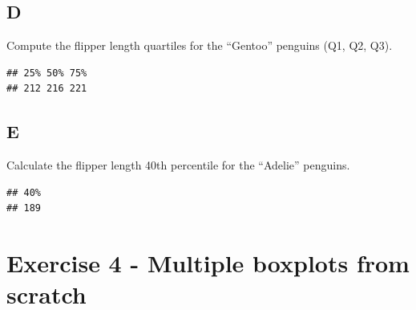 \documentclass[
]{article}
\newenvironment{Shaded}{\begin{snugshade}}{\end{snugshade}}
\newcommand{\AttributeTok}[1]{\textcolor[rgb]{0.13,0.29,0.53}{#1}}
\newcommand{\ConstantTok}[1]{\textcolor[rgb]{0.56,0.35,0.01}{#1}}
\newcommand{\FloatTok}[1]{\textcolor[rgb]{0.00,0.00,0.81}{#1}}
\newcommand{\FunctionTok}[1]{\textcolor[rgb]{0.13,0.29,0.53}{\textbf{#1}}}
\newcommand{\NormalTok}[1]{#1}
\newcommand{\OtherTok}[1]{\textcolor[rgb]{0.56,0.35,0.01}{#1}}
\newcommand{\SpecialCharTok}[1]{\textcolor[rgb]{0.81,0.36,0.00}{\textbf{#1}}}
\newcommand{\StringTok}[1]{\textcolor[rgb]{0.31,0.60,0.02}{#1}}
\begin{document}
\hypertarget{d-2}{%
\subsection{D}\label{d-2}}

Compute the flipper length quartiles for the ``Gentoo'' penguins (Q1,
Q2, Q3).

\begin{Shaded}
\end{Shaded}

\begin{verbatim}
## 25% 50% 75% 
## 212 216 221
\end{verbatim}

\hypertarget{e-1}{%
\subsection{E}\label{e-1}}

Calculate the flipper length 40th percentile for the ``Adelie''
penguins.

\begin{Shaded}
\end{Shaded}

\begin{verbatim}
## 40% 
## 189
\end{verbatim}

\hypertarget{exercise-4---multiple-boxplots-from-scratch}{%
\section{Exercise 4 - Multiple boxplots from
scratch}\label{exercise-4---multiple-boxplots-from-scratch}}
\end{document}
